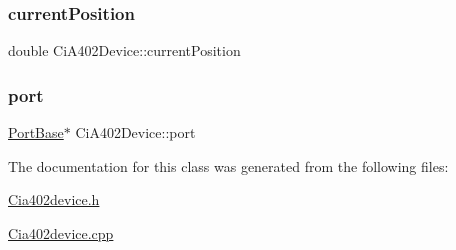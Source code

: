 \mbox{\label{classCiA402Device_adb251ae496aeca707dcc51b43c64d0b8}} 
\subsubsection{\texorpdfstring{current\+Position}{currentPosition}}
{\footnotesize\ttfamily double Ci\+A402\+Device\+::current\+Position\hspace{0.3cm}{\ttfamily [private]}}

\mbox{\label{classCiA402Device_abc96eb117cc948d86e3bd4c07c7fe807}} 
\subsubsection{\texorpdfstring{port}{port}}
{\footnotesize\ttfamily \hyperlink{classPortBase}{Port\+Base}$\ast$ Ci\+A402\+Device\+::port\hspace{0.3cm}{\ttfamily [private]}}



The documentation for this class was generated from the following files\+:\begin{DoxyCompactItemize}
\item 
\hyperlink{Cia402device_8h}{Cia402device.\+h}\item 
\hyperlink{Cia402device_8cpp}{Cia402device.\+cpp}\end{DoxyCompactItemize}
